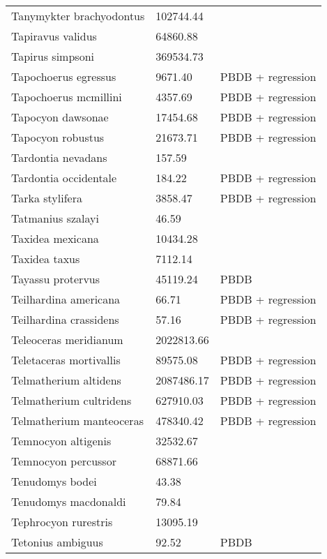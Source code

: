 \documentclass{article}
\begin{document}
\begin{center}
\begin{longtable}{p{} p{} p{}}
    Tanymykter brachyodontus & 102744.44 & \cite{Tomiya2013} \\ 
    Tapiravus validus & 64860.88 & \cite{Tomiya2013} \\ 
    Tapirus simpsoni & 369534.73 & \cite{Tomiya2013} \\ 
    Tapochoerus egressus & 9671.40 & PBDB + regression \\ 
    Tapochoerus mcmillini & 4357.69 & PBDB + regression \\ 
    Tapocyon dawsonae & 17454.68 & PBDB + regression \\ 
    Tapocyon robustus & 21673.71 & PBDB + regression \\ 
    Tardontia nevadans & 157.59 & \cite{Tomiya2013} \\ 
    Tardontia occidentale & 184.22 & PBDB + regression \\ 
    Tarka stylifera & 3858.47 & PBDB + regression \\ 
    Tatmanius szalayi & 46.59 & \cite{Ferrusquia-Villafranca2006} \\ 
    Taxidea mexicana & 10434.28 & \cite{Bloch2007} \\ 
    Taxidea taxus & 7112.14 & \cite{Smith2004} \\ 
    Tayassu protervus & 45119.24 & PBDB \\ 
    Teilhardina americana & 66.71 & PBDB + regression \\ 
    Teilhardina crassidens & 57.16 & PBDB + regression \\ 
    Teleoceras meridianum & 2022813.66 & \cite{Tomiya2013} \\ 
    Teletaceras mortivallis & 89575.08 & PBDB + regression \\ 
    Telmatherium altidens & 2087486.17 & PBDB + regression \\ 
    Telmatherium cultridens & 627910.03 & PBDB + regression \\ 
    Telmatherium manteoceras & 478340.42 & PBDB + regression \\ 
    Temnocyon altigenis & 32532.67 & \cite{Tomiya2013} \\ 
    Temnocyon percussor & 68871.66 & \cite{Tomiya2013} \\ 
    Tenudomys bodei & 43.38 & \cite{Tomiya2013} \\ 
    Tenudomys macdonaldi & 79.84 & \cite{Tomiya2013} \\ 
    Tephrocyon rurestris & 13095.19 & \cite{Tomiya2013} \\ 
    Tetonius ambiguus & 92.52 & PBDB \\ 

\end{longtable}
\end{center}
\end{document}
